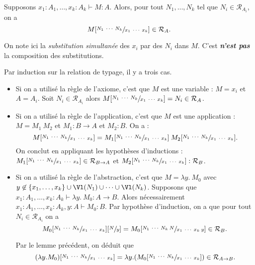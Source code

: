 \documentclass[./main]{subfiles}
\begin{document}
  \begin{lem}
    Supposons $x_1 : A_1, \ldots, x_k : A_k \vdash M : A$.
    Alors, pour tout $N_1, \ldots, N_k$ tel que $N_i \in \mathcal{R}_{A_i}$, on a \[
      M[\sfrac{N_1 \: \cdots \: N_k}{x_1 \: \cdots \: x_k}] \in \mathcal{R}_A
    .\]
    
    On note ici la \textit{substitution simultanée} des $x_i$ par des $N_i$ dans $M$.
    C'est \textbf{\textit{n'est pas}} la composition des substitutions.
  \end{lem}
  \begin{prv}
    Par induction sur la relation de typage, il y a trois cas.
    \begin{itemize}
      \item Si on a utilisé la règle de l'axiome, c'est que $M$ est une variable : $M = x_i$ et $A = A_i$.
        Soit  $N_i \in \mathcal{R}_{A_i}$ alors $M[\sfrac{N_1 \: \cdots \: N_k}{x_1 \: \cdots \: x_k}] = N_i \in \mathcal{R}_A$.
      \item Si on a utilisé la règle de l'application, c'est que $M$ est une application : $M = M_1 \: M_2$ et $M_1 : B \to A$ et $M_2 : B$.
        On a : \[
          M[\sfrac{N_1 \: \cdots \: N_k}{x_1 \: \cdots \: x_k}] =
          M_1[\sfrac{N_1 \: \cdots \: N_k}{x_1 \: \cdots \: x_k}] \:
          M_2[\sfrac{N_1 \: \cdots \: N_k}{x_1 \: \cdots \: x_k}]
        .\]
        On conclut en appliquant les hypothèses d'inductions : $M_1[\sfrac{N_1 \: \cdots \: N_k}{x_1 \: \cdots \: x_k}] \in \mathcal{R}_{B \to A}$ et $M_2[\sfrac{N_1 \: \cdots \: N_k}{x_1 \: \cdots \: x_k}] : \mathcal{R}_{B}$.
      \item Si on a utilisé la règle de l'abstraction, c'est que $M = \lambda y.\: M_0$ avec $y \not\in \{x_1, \ldots, x_k\} \cup \Vl(N_1) \cup \cdots \cup \Vl(N_k)$.
        Supposons que  $x_1 : A_1, \ldots, x_k : A_k \vdash \lambda y.\: M_0 : A \to B$.
        Alors nécessairement $x_1 : A_1, \ldots, x_k : A_k, y : A \vdash M_0 : B$.
        Par hypothèse d'induction, on a que 
        pour tout $N_i \in \mathcal{R}_{A_i}$ on a
        \[
          M_0 [\sfrac{N_1\: \cdots\: N_k}{x_1 \: \cdots \: x_k}][\sfrac{N}{y}] = M_0 [\sfrac{N_1\: \cdots\: N_k\: N}{x_1 \: \cdots \: x_k \: y}] \in \mathcal{R}_B
        .\]

        Par le lemme précédent, on déduit que \[
          (\lambda y. M_0) [\sfrac{N_1\: \cdots\: N_k}{x_1 \: \cdots \: x_k}] = \lambda y. (M_0 [\sfrac{N_1\: \cdots\: N_k}{x_1 \: \cdots \: x_k}]) \in \mathcal{R}_{A \to B}
        .\]
    \end{itemize}
  \end{prv}
\end{document}
